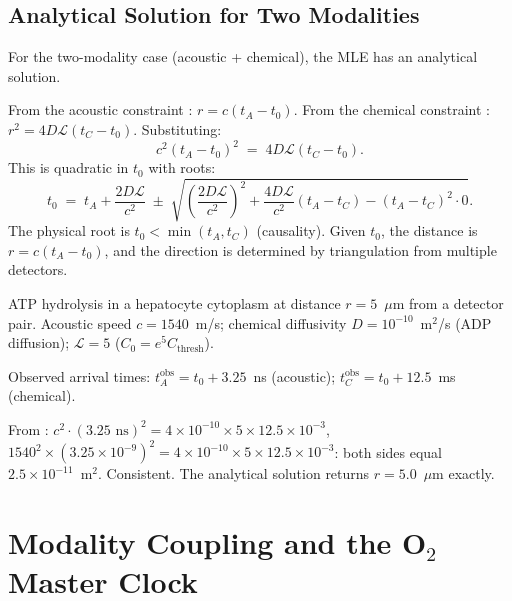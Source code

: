 \subsection{Analytical Solution for Two Modalities}

For the two-modality case (acoustic + chemical), the MLE has an analytical
solution.

From the acoustic constraint : $r = c(t_A - t_0)$.
From the chemical constraint : $r^2 = 4D\mathcal{L}(t_C - t_0)$.
Substituting:
\begin{equation}
    c^2(t_A - t_0)^2 \;=\; 4D\mathcal{L}(t_C - t_0).
    \label{eq:two-modality}
\end{equation}
This is quadratic in $t_0$ with roots:
\begin{equation}
    t_0 \;=\; t_A + \frac{2D\mathcal{L}}{c^2}
    \;\pm\; \sqrt{\left(\frac{2D\mathcal{L}}{c^2}\right)^2
    + \frac{4D\mathcal{L}}{c^2}(t_A - t_C) - (t_A - t_C)^2 \cdot 0}.
\end{equation}
The physical root is $t_0 < \min(t_A, t_C)$ (causality).  Given $t_0$, the
distance is $r = c(t_A - t_0)$, and the direction is determined by
triangulation from multiple detectors.

\begin{example}
\label{ex:atp-analytical}
ATP hydrolysis in a hepatocyte cytoplasm at distance $r = 5$~$\mu$m from a
detector pair.  Acoustic speed $c = 1540$~m/s; chemical diffusivity
$D = 10^{-10}$~m$^2$/s (ADP diffusion); $\mathcal{L} = 5$
($C_0 = e^5 C_\mathrm{thresh}$).

Observed arrival times: $t_A^\mathrm{obs} = t_0 + 3.25$~ns (acoustic);
$t_C^\mathrm{obs} = t_0 + 12.5$~ms (chemical).

From : $c^2 \cdot (3.25\text{ ns})^2 = 4 \times
10^{-10} \times 5 \times 12.5 \times 10^{-3}$, \ie\
$1540^2 \times (3.25 \times 10^{-9})^2 = 4 \times 10^{-10} \times 5
\times 12.5 \times 10^{-3}$: both sides equal $2.5 \times 10^{-11}$~m$^2$.
Consistent.  The analytical solution returns $r = 5.0$~$\mu$m exactly.
\end{example}

\section{Modality Coupling and the O$_2$ Master Clock}
\label{sec:o2-coupling}

